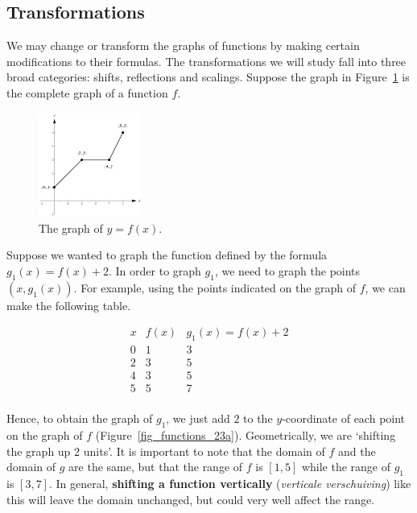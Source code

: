 \subsection{Transformations}
\label{sec_transformations}

We may change or transform the graphs of functions by making certain modifications to their formulas. The transformations we will study fall into three broad categories:  shifts, reflections and scalings.  Suppose the graph in Figure~\ref{fig_functions_22} is the complete graph of a function $f$.

\begin{figure}[h!]
	\begin{center}
			\includegraphics[width=0.3\textwidth]{fig_functions_22}
	\caption{The graph of $y=f(x)$.}
	\label{fig_functions_22}
	\end{center}
\end{figure}


Suppose we wanted to graph the function defined by the formula $g_1(x) = f(x) + 2$.  In order to graph $g_1$, we need to graph the points $(x,g_1(x))$.  For example, using the points indicated on the graph of $f$, we can make the following table.

\[ \begin{array}{c|cc}  


x  & f(x) & g_1(x)=f(x)+2  \\ \hline\hline
0  & 1 & 3 \\  
2  & 3 &  5  \\  
4  & 3 &  5 \\  
5  & 5 &  7  \\  

\end{array} \] 

Hence, to obtain the graph of $g_1$, we just add $2$ to the $y$-coordinate of each point on the graph of $f$ (Figure~\ref{fig_functions_23a}).  Geometrically, we are `shifting the graph up $2$ units'.  It is important to note that the domain of $f$ and the domain of $g$ are the same, but that the range of $f$ is $[1,5]$ while the range of $g_1$ is $[3,7]$.  In general, \textbf{shifting a function vertically} (\textit{verticale verschuiving}) like this will leave the domain unchanged, but could very well affect the range.

